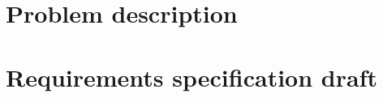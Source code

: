




		
	\setcounter{tocdepth}{2}
	\tableofcontents
	\pagebreak

	\chapter{Problem description}
	

	\pagebreak
	
	\chapter{Requirements specification draft}
	
	
	\pagebreak
	
	\printbibliography[title={Bibliography}]
	

